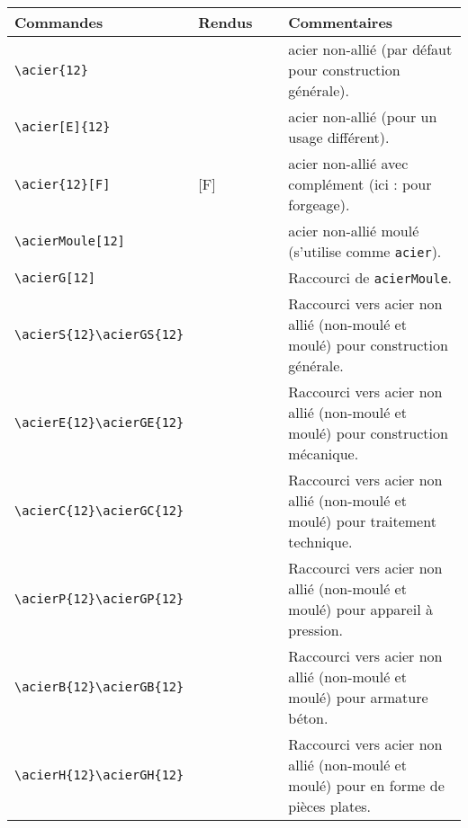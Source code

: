 \documentclass[a4paper,12pt]{article}
\begin{document}
		\noindent
		\begin{tabular}{|p{0.4\linewidth}|p{0.2\linewidth}|p{0.4\linewidth}|}
			\hline
				\textbf{Commandes}&\textbf{Rendus}&\textbf{Commentaires}
			\\\hline\hline
				\verb!\acier{12}!	&	\acier{12}	&	acier non-allié (par défaut pour construction générale).
			\\\hline
				\verb!\acier[E]{12}!	&	\acier[E]{12}	&	acier non-allié (pour un usage différent).
			\\\hline
				\verb!\acier{12}[F]!	&	\acier{12}[F]	&	acier non-allié avec complément (ici : pour forgeage).
			\\\hline
				\verb!\acierMoule[12]!	&	\acierMoule{12}	&	acier non-allié moulé (s'utilise comme \verb!acier!).
			\\\hline
				\verb!\acierG[12]!	&	\acierG{12}	&	Raccourci de \verb!acierMoule!.
			\\\hline
				\verb!\acierS{12}!\newline\verb!\acierGS{12}!	&	\acierS{12}\newline\acierGS{12}	&	Raccourci vers acier non allié (non-moulé et moulé) pour construction générale.
			\\\hline
				\verb!\acierE{12}!\newline\verb!\acierGE{12}!	&	\acierE{12}\newline\acierGE{12}	&	Raccourci vers acier non allié (non-moulé et moulé) pour construction mécanique.
			\\\hline
				\verb!\acierC{12}!\newline\verb!\acierGC{12}!	&	\acierC{12}\newline\acierGC{12}	&	Raccourci vers acier non allié (non-moulé et moulé) pour traitement technique.
			\\\hline
				\verb!\acierP{12}!\newline\verb!\acierGP{12}!	&	\acierP{12}\newline\acierGP{12}	&	Raccourci vers acier non allié (non-moulé et moulé) pour appareil à pression.
			\\\hline
				\verb!\acierB{12}!\newline\verb!\acierGB{12}!	&	\acierB{12}\newline\acierGB{12}	&	Raccourci vers acier non allié (non-moulé et moulé) pour armature béton.
			\\\hline
				\verb!\acierH{12}!\newline\verb!\acierGH{12}!	&	\acierH{12}\newline\acierGH{12}	&	Raccourci vers acier non allié (non-moulé et moulé) pour en forme de pièces plates.
			\\\hline
		\end{tabular}
\end{document}
